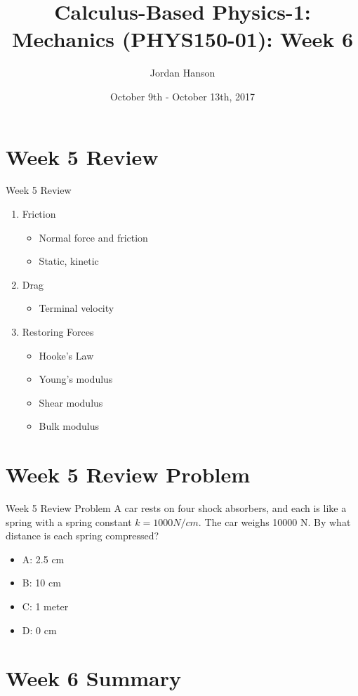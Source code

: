 \documentclass{beamer}
\title{Calculus-Based Physics-1: Mechanics (PHYS150-01): Week 6}
\date{October 9th - October 13th, 2017}
\author{Jordan Hanson}
\institute{Whittier College Department of Physics and Astronomy}
\begin{document}
\maketitle

\section{Week 5 Review}

\begin{frame}{Week 5 Review}
\begin{enumerate}
\item \alert{Friction}
\begin{itemize}
\item Normal force and friction
\item Static, kinetic
\end{itemize}
\item \alert{Drag}
\begin{itemize}
\item Terminal velocity
\end{itemize}
\item \alert{Restoring Forces}
\begin{itemize}
\item Hooke's Law
\item Young's modulus
\item Shear modulus
\item Bulk modulus
\end{itemize}
\end{enumerate}
\end{frame}

\section{Week 5 Review Problem}

\begin{frame}{Week 5 Review Problem}
A car rests on four shock absorbers, and each is like a spring with a spring constant $k = 1000 N/cm$.  The car weighs 10000 N.  By what distance is each spring compressed?
\begin{itemize}
\item A: 2.5 cm
\item B: 10 cm
\item C: 1 meter
\item D: 0 cm
\end{itemize}
\end{frame}

\section{Week 6 Summary}
\end{document}
